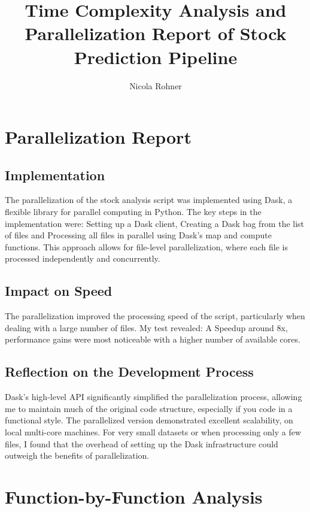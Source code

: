 \documentclass[11pt,a4paper]{article}
\title{Time Complexity Analysis and Parallelization Report of Stock Prediction Pipeline}
\author{Nicola Rohner}
\begin{document}
\maketitle

\section{Parallelization Report}

\subsection{Implementation}
The parallelization of the stock analysis script was implemented using Dask, a flexible library for parallel computing in Python. The key steps in the implementation were:
Setting up a Dask client, Creating a Dask bag from the list of files and Processing all files in parallel using Dask's map and compute functions.
This approach allows for file-level parallelization, where each file is processed independently and concurrently.

\subsection{Impact on Speed}
The parallelization improved the processing speed of the script, particularly when dealing with a large number of files. My test revealed:
A Speedup around 8x, performance gains were most noticeable with a higher number of available cores.

\subsection{Reflection on the Development Process}
Dask's high-level API significantly simplified the parallelization process, allowing me to maintain much of the original code structure, especially if you code in a functional style.
The parallelized version demonstrated excellent scalability, on local multi-core machines.
For very small datasets or when processing only a few files, I found that the overhead of setting up the Dask infrastructure could outweigh the benefits of parallelization. 


\section{Function-by-Function Analysis}
\end{document}

